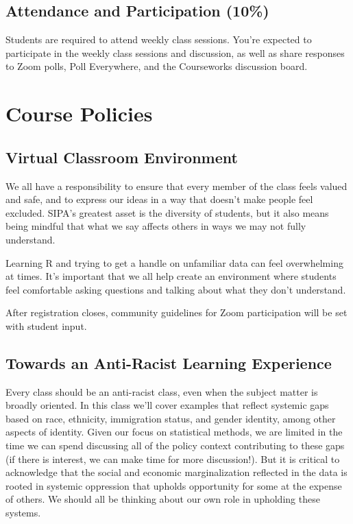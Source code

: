 \documentclass[11pt,]{article}
\begin{document}
\hypertarget{attendance-and-participation-10}{%
\subsection{Attendance and Participation
(10\%)}\label{attendance-and-participation-10}}

Students are required to attend weekly class sessions. You're expected
to participate in the weekly class sessions and discussion, as well as
share responses to Zoom polls, Poll Everywhere, and the Courseworks
discussion board.

\hypertarget{course-policies}{%
\section{Course Policies}\label{course-policies}}

\hypertarget{virtual-classroom-environment}{%
\subsection{Virtual Classroom
Environment}\label{virtual-classroom-environment}}

We all have a responsibility to ensure that every member of the class
feels valued and safe, and to express our ideas in a way that doesn't
make people feel excluded. SIPA's greatest asset is the diversity of
students, but it also means being mindful that what we say affects
others in ways we may not fully understand.

Learning R and trying to get a handle on unfamiliar data can feel
overwhelming at times. It's important that we all help create an
environment where students feel comfortable asking questions and talking
about what they don't understand.

After registration closes, community guidelines for Zoom participation
will be set with student input.

\hypertarget{towards-an-anti-racist-learning-experience}{%
\subsection{Towards an Anti-Racist Learning
Experience}\label{towards-an-anti-racist-learning-experience}}

Every class should be an anti-racist class, even when the subject matter
is broadly oriented. In this class we'll cover examples that reflect
systemic gaps based on race, ethnicity, immigration status, and gender
identity, among other aspects of identity. Given our focus on
statistical methods, we are limited in the time we can spend discussing
all of the policy context contributing to these gaps (if there is
interest, we can make time for more discussion!). But it is critical to
acknowledge that the social and economic marginalization reflected in
the data is rooted in systemic oppression that upholds opportunity for
some at the expense of others. We should all be thinking about our own
role in upholding these systems.
\end{document}
